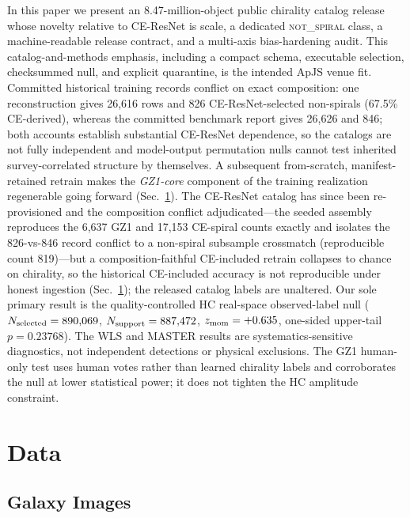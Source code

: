 \documentclass[twocolumn,linenumbers]{aastex702}
\newcommand{\NS}{\textsc{not\_spiral}}
\begin{document}
In this paper we present an 8.47-million-object public chirality catalog release whose novelty relative to CE-ResNet is scale, a dedicated \NS{} class, a machine-readable release contract, and a multi-axis bias-hardening audit. This catalog-and-methods emphasis, including a compact schema, executable selection, checksummed null, and explicit quarantine, is the intended ApJS venue fit. Committed historical training records conflict on exact composition: one reconstruction gives 26,616 rows and 826 CE-ResNet-selected non-spirals (67.5\% CE-derived), whereas the committed benchmark report gives 26,626 and 846; both accounts establish substantial CE-ResNet dependence, so the catalogs are not fully independent and model-output permutation nulls cannot test inherited survey-correlated structure by themselves. A subsequent from-scratch, manifest-retained retrain makes the \emph{GZ1-core} component of the training realization regenerable going forward (Sec.~\ref{sec:data}). The CE-ResNet catalog has since been re-provisioned and the composition conflict adjudicated---the seeded assembly reproduces the 6,637 GZ1 and 17,153 CE-spiral counts exactly and isolates the 826-vs-846 record conflict to a non-spiral subsample crossmatch (reproducible count 819)---but a composition-faithful CE-included retrain collapses to chance on chirality, so the historical CE-included accuracy is not reproducible under honest ingestion (Sec.~\ref{sec:data}); the released catalog labels are unaltered. Our sole primary result is the quality-controlled HC real-space observed-label null ($N_{\rm selected}=890{,}069$, $N_{\rm support}=887{,}472$, $z_{\rm mom}=+0.635$, one-sided upper-tail $p=0.23768$). The WLS and MASTER results are systematics-sensitive diagnostics, not independent detections or physical exclusions. The GZ1 human-only test uses human votes rather than learned chirality labels and corroborates the null at lower statistical power; it does not tighten the HC amplitude constraint.

\section{Data}
\label{sec:data}

\subsection{Galaxy Images}
\end{document}
